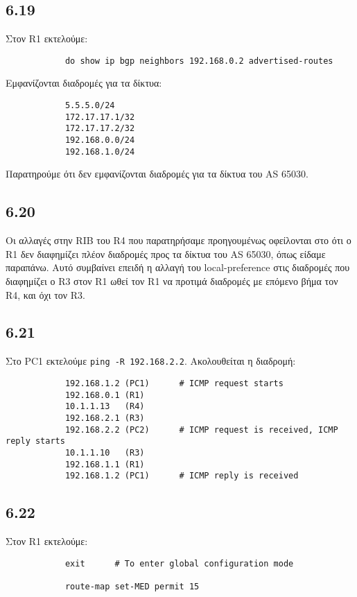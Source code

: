 \documentclass[a4paper, 12pt]{article}
\begin{document}
	\subsection*{6.19}
		Στον R1 εκτελούμε:
		
		\begin{verbatim}
			do show ip bgp neighbors 192.168.0.2 advertised-routes
		\end{verbatim}
		
		Εμφανίζονται διαδρομές για τα δίκτυα:
		
		\begin{verbatim}
			5.5.5.0/24     
			172.17.17.1/32 
			172.17.17.2/32 
			192.168.0.0/24 
			192.168.1.0/24 
		\end{verbatim}
		
		Παρατηρούμε ότι δεν εμφανίζονται διαδρομές για τα δίκτυα του AS 65030.

	\subsection*{6.20}
		Οι αλλαγές στην RIB του R4 που παρατηρήσαμε προηγουμένως οφείλονται στο ότι ο R1 δεν διαφημίζει πλέον διαδρομές προς τα δίκτυα του AS 65030, όπως είδαμε παραπάνω. Αυτό συμβαίνει επειδή η αλλαγή του local-preference στις διαδρομές που διαφημίζει ο R3 στον R1 ωθεί τον R1 να προτιμά διαδρομές με επόμενο βήμα τον R4, και όχι τον R3.

	\subsection*{6.21}
		Στο PC1 εκτελούμε \verb|ping -R 192.168.2.2|. Ακολουθείται η διαδρομή:
		
		\begin{verbatim}
			192.168.1.2 (PC1)      # ICMP request starts
			192.168.0.1 (R1)
			10.1.1.13   (R4)
			192.168.2.1 (R3)
			192.168.2.2 (PC2)      # ICMP request is received, ICMP reply starts
			10.1.1.10   (R3)
			192.168.1.1 (R1)
			192.168.1.2 (PC1)      # ICMP reply is received
		\end{verbatim}

	\subsection*{6.22}
		Στον R1 εκτελούμε:
		
		\begin{verbatim}
			exit      # To enter global configuration mode
			
			route-map set-MED permit 15
		\end{verbatim}
\end{document}
